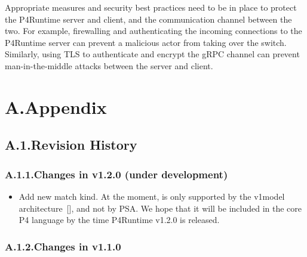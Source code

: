 \documentclass[11pt]{article}
\begin{document}
{%
\noindent{}Appropriate measures and security best practices need to be in place to protect
the P4Runtime server and client, and the communication channel between the two.
For example, firewalling and authenticating the incoming connections to the
P4Runtime server can prevent a malicious actor from taking over the switch.
Similarly, using TLS to authenticate and encrypt the gRPC channel can prevent
man-in-the-middle attacks between the server and client.%

\section{A.\hspace*{0.5em}Appendix}\label{sec-appendix}%

\subsection{A.1.\hspace*{0.5em}Revision History}\label{sec-revision-history}%

\subsubsection{A.1.1.\hspace*{0.5em}Changes in v1.2.0 (under development)}\label{sec-changes-in-v120-under-development}%

\begin{itemize}[noitemsep,topsep=\mdcompacttopsep]%

\item{}Add new  match kind. At the moment,  is only supported by
the v1model architecture~[], and not by PSA. We hope that it will be
included in the core P4 language by the time P4Runtime v1.2.0 is released.%
\end{itemize}%

\subsubsection{A.1.2.\hspace*{0.5em}Changes in v1.1.0}\label{sec-changes-in-v110}%

}
\end{document}
